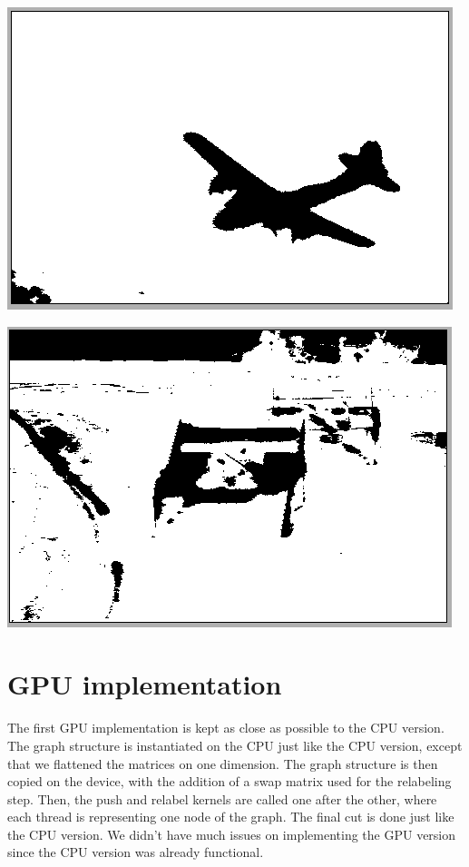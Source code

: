 \documentclass{article}
\begin{document}
\begin{center}
\includegraphics[scale=0.6]{pics/plane segmented.PNG} 
\end{center}

\begin{center}
\includegraphics[scale=0.6]{pics/racing car segmented.PNG} 
\end{center}

\section{GPU implementation}
The first GPU implementation is kept as close as possible to the CPU version. The graph structure is instantiated on the CPU just like the CPU version, except that we flattened the matrices on one dimension. The graph structure is then copied on the device, with the addition of a swap matrix used for the relabeling step. Then, the push and relabel kernels are called one after the other, where each thread is representing one node of the graph. The final cut is done just like the CPU version. We didn't have much issues on implementing the GPU version since the CPU version was already functional.
\end{document}
